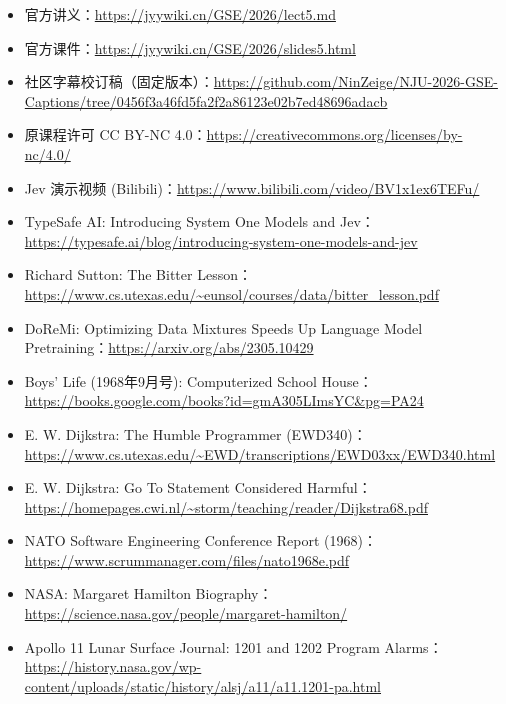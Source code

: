\documentclass[UTF8,a4paper,11pt,fontset=fandol]{ctexart}
\begin{document}
\begin{itemize}

\item 官方讲义：\url{https://jyywiki.cn/GSE/2026/lect5.md}

\item 官方课件：\url{https://jyywiki.cn/GSE/2026/slides5.html}

\item 社区字幕校订稿（固定版本）：\url{https://github.com/NinZeige/NJU-2026-GSE-Captions/tree/0456f3a46fd5fa2f2a86123e02b7ed48696adacb}

\item 原课程许可 CC BY-NC 4.0：\url{https://creativecommons.org/licenses/by-nc/4.0/}

\item Jev 演示视频 (Bilibili)：\url{https://www.bilibili.com/video/BV1x1ex6TEFu/}

\item TypeSafe AI: Introducing System One Models and Jev：\url{https://typesafe.ai/blog/introducing-system-one-models-and-jev}

\item Richard Sutton: The Bitter Lesson：\url{https://www.cs.utexas.edu/~eunsol/courses/data/bitter_lesson.pdf}

\item DoReMi: Optimizing Data Mixtures Speeds Up Language Model Pretraining：\url{https://arxiv.org/abs/2305.10429}

\item Boys' Life (1968年9月号): Computerized School House：\url{https://books.google.com/books?id=gmA305LImsYC&pg=PA24}

\item E. W. Dijkstra: The Humble Programmer (EWD340)：\url{https://www.cs.utexas.edu/~EWD/transcriptions/EWD03xx/EWD340.html}

\item E. W. Dijkstra: Go To Statement Considered Harmful：\url{https://homepages.cwi.nl/~storm/teaching/reader/Dijkstra68.pdf}

\item NATO Software Engineering Conference Report (1968)：\url{https://www.scrummanager.com/files/nato1968e.pdf}

\item NASA: Margaret Hamilton Biography：\url{https://science.nasa.gov/people/margaret-hamilton/}

\item Apollo 11 Lunar Surface Journal: 1201 and 1202 Program Alarms：\url{https://history.nasa.gov/wp-content/uploads/static/history/alsj/a11/a11.1201-pa.html}


\end{itemize}
\end{document}

